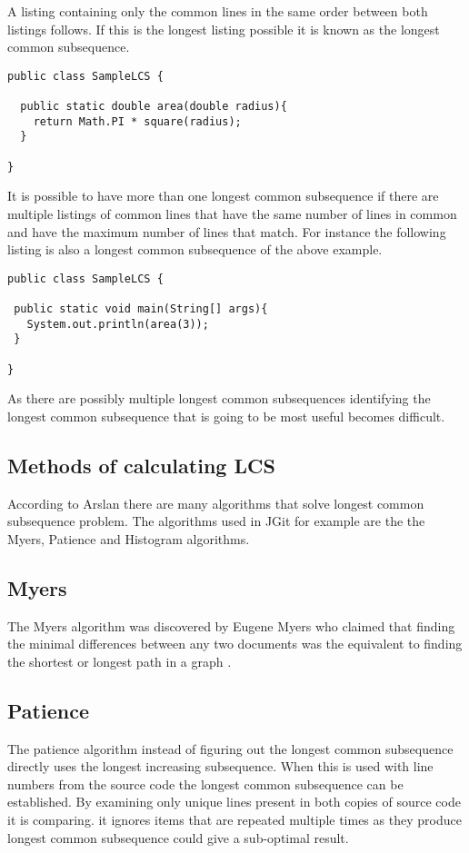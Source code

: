 A listing containing only the common lines in the same order between both listings follows.  If this is the longest listing possible it is known as the longest common subsequence.  

\begin{lstlisting}
public class SampleLCS { 

  public static double area(double radius){
    return Math.PI * square(radius);
  }
  
}

\end{lstlisting}

It is possible to have more than one longest common subsequence if there are multiple listings of common lines that have the same number of lines in common and have the maximum number of lines that match.  For instance the following listing is also a longest common subsequence of the above example.

\begin{lstlisting}
public class SampleLCS {

 public static void main(String[] args){
   System.out.println(area(3));
 }
 
}
\end{lstlisting}

As there are possibly multiple longest common subsequences identifying the longest common subsequence that is going to be most useful becomes difficult.

\subsection{Methods of calculating LCS}
According to Arslan \cite{Arslan2010} there are many algorithms that solve longest common subsequence problem. The algorithms used in JGit for example are the the Myers, Patience and Histogram algorithms.

\subsection{Myers}
The Myers algorithm was discovered by Eugene Myers who claimed that finding the minimal differences between any two documents was the equivalent to finding the shortest or longest path in a graph \cite{Myers1986}. 

\subsection{Patience}
The patience algorithm instead of figuring out the longest common subsequence directly uses the longest increasing subsequence.
When this is used with line numbers from the source code the longest common subsequence can be established.
By examining only unique lines present in both copies of source code it is comparing. it ignores items that are repeated multiple times as they produce longest common subsequence could give a sub-optimal result.

